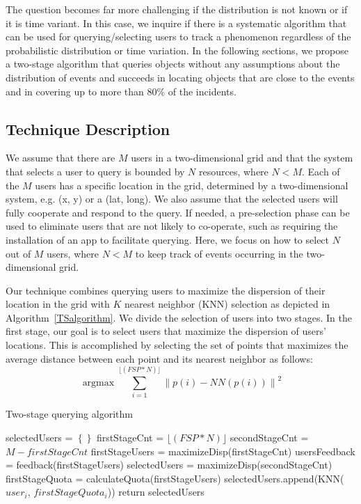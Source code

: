 \documentclass{acm_proc_article-sp}
\newcommand\floor[1]{\lfloor#1\rfloor}
\DeclareMathOperator*{\argmax}{argmax}
\newcommand{\norm}[1]{\left\lVert #1 \right\rVert}
\begin{document}
The question becomes far more challenging if the distribution is not known or if it is time variant. In this case, we inquire if there is a systematic algorithm that can be used for querying/selecting users to track a phenomenon regardless of the probabilistic distribution or time variation. In the following sections, we propose a two-stage algorithm that queries objects without any assumptions about the distribution of events and succeeds in locating objects that are close to the events and in covering up to more than $80\%$ of the incidents. \par

\subsection{Technique Description}
We assume that there are $M$ users in a two-dimensional grid and that the system that selects a user to query is bounded by $N$ resources, where $N < M$.  Each of the $M$ users has a specific location in the grid, determined by a two-dimensional system, e.g. (x, y) or a (lat, long). We also assume that the selected users will fully cooperate and respond to the query. If needed, a pre-selection phase can be used to eliminate users that are not likely to co-operate, such as requiring the installation of an app to facilitate querying. Here, we focus on how to select $N$ out of $M$ users, where $N < M$ to keep track of events occurring in the two-dimensional grid.\par

Our technique combines querying users to maximize the dispersion of their location in the grid with $K$ nearest neighbor (KNN) selection as depicted in Algorithm~\ref{TSalgorithm}. We divide the selection of users into two stages. In the first stage, our goal is to select users that maximize the dispersion of users' locations. This is accomplished by selecting the set of points that maximizes the average distance between each point and its nearest neighbor as follows:
\begin{equation} \label{eq:maxDisp}
\argmax \sum_{i=1}^{\floor{(FSP*N)}} \norm{p(i) - NN(p(i))}^2
\end{equation}
\begin{algorithm}
\caption{Two-stage querying algorithm}
\label{TSalgorithm}
\begin{algorithmic}[1]
        \State selectedUsers = $\left\{\right\}$
        \State firstStageCnt = $\floor{(FSP*N)}$
        \State secondStageCnt = $M - firstStageCnt$
        \State firstStageUsers = maximizeDisp(firstStageCnt)
        \State usersFeedback = feedback(firstStageUsers)
               \State selectedUsers = maximizeDisp(secondStageCnt){}
        \Else
        \EndIf
      \State firstStageQuota = calculateQuota(firstStageUsers)
    \State selectedUsers.append(KNN($user_i$, $firstStageQuota_i$))
  \EndFor
\State return {selectedUsers}
\EndFunction
\end{algorithmic}
\end{algorithm}
\end{document}
